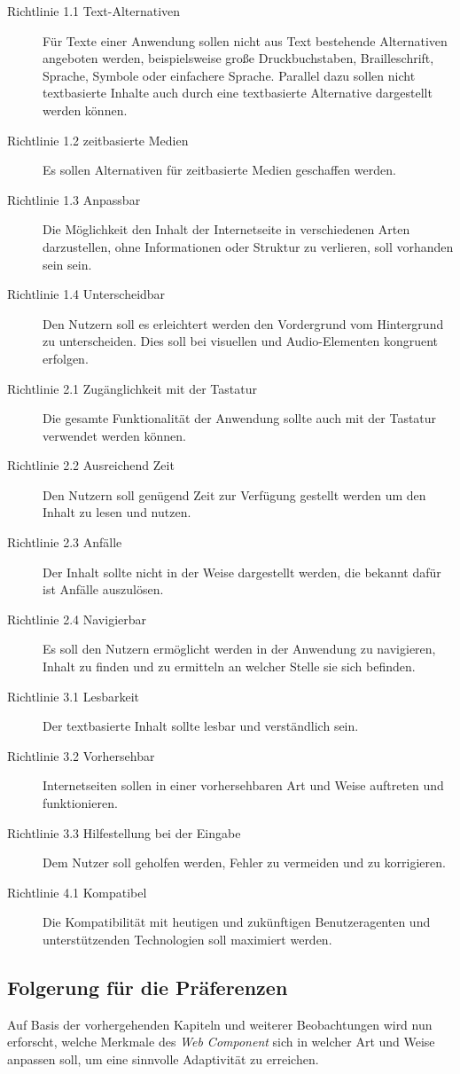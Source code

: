 \documentclass[12pt, paper=a4, bibtotoc, toc=listof, headsepline=true]{scrreprt}
\begin{document}
		\begin{description}
			\item [Richtlinie 1.1 Text-Alternativen] Für Texte einer Anwendung sollen nicht aus Text bestehende Alternativen angeboten werden, beispielsweise große Druckbuchstaben, Brailleschrift, Sprache, Symbole oder einfachere Sprache. Parallel dazu sollen nicht textbasierte Inhalte auch durch eine textbasierte Alternative dargestellt werden können.
			\item[Richtlinie 1.2 zeitbasierte Medien] Es sollen Alternativen für zeitbasierte Medien geschaffen werden.
			\item[Richtlinie 1.3 Anpassbar] Die Möglichkeit den Inhalt der Internetseite in verschiedenen Arten darzustellen, ohne Informationen oder Struktur zu verlieren, soll vorhanden sein sein.
			\item[Richtlinie 1.4 Unterscheidbar] Den Nutzern soll es erleichtert werden den Vordergrund vom Hintergrund zu unterscheiden. Dies soll bei visuellen und Audio-Elementen kongruent erfolgen. 
			\item[Richtlinie 2.1 Zugänglichkeit mit der Tastatur] Die gesamte Funktionalität der Anwendung sollte auch mit der Tastatur verwendet werden können.	
			\item[Richtlinie 2.2 Ausreichend Zeit] Den Nutzern soll genügend Zeit zur Verfügung gestellt werden um den Inhalt zu lesen und nutzen.
			\item[Richtlinie 2.3 Anfälle] Der Inhalt sollte nicht in der Weise dargestellt werden, die bekannt dafür ist Anfälle auszulösen.
			\item[Richtlinie 2.4 Navigierbar] Es soll den Nutzern ermöglicht werden in der Anwendung zu navigieren, Inhalt zu finden und zu ermitteln an welcher Stelle sie sich befinden.
			\item[Richtlinie 3.1 Lesbarkeit] Der textbasierte Inhalt sollte lesbar und verständlich sein.	
			\item[Richtlinie 3.2 Vorhersehbar] Internetseiten sollen in einer vorhersehbaren Art und Weise auftreten und funktionieren.
			\item[Richtlinie 3.3 Hilfestellung bei der Eingabe] Dem Nutzer soll geholfen werden, Fehler zu vermeiden und zu korrigieren.
			\item[Richtlinie 4.1 Kompatibel] Die Kompatibilität mit heutigen und zukünftigen Benutzeragenten und unterstützenden Technologien soll maximiert werden.
		\end{description}
		\subsection{Folgerung für die Präferenzen}
		Auf Basis der vorhergehenden Kapiteln und weiterer Beobachtungen wird nun erforscht, welche Merkmale des \emph{Web Component} sich in welcher Art und Weise anpassen soll, um eine sinnvolle Adaptivität zu erreichen.
\end{document}
